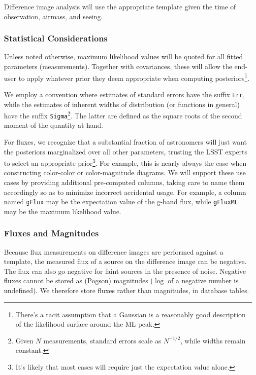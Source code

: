 \documentclass[12pt]{article}
\begin{document}
Difference image analysis will use the appropriate template given the time of observation, airmass, and seeing.

\subsubsection{Statistical Considerations}

Unless noted otherwise, maximum likelihood values will be quoted for all fitted parameters (measurements). Together with covariances, these will allow the end-user to apply whatever prior they deem appropriate when computing posteriors\footnote{There's a tacit assumption that a Gaussian is a reasonably good description of the likelihood surface around the ML peak.}.

We employ a convention where estimates of standard errors have the suffix {\tt Err}, while the estimates of inherent widths of distribution (or functions in general) have the suffix {\tt Sigma}\footnote{Given $N$ measurements, standard errors scale as $N^{-1/2}$, while widths remain constant.}. The latter are defined as the square roots of the second moment of the quantity at hand.

For fluxes, we recognize that a substantial fraction of astronomers will just want the posteriors marginalized over all other parameters, trusting the LSST experts to select an appropriate prior\footnote{It's likely that most cases will require just the expectation value alone.}. For example, this is nearly always the case when constructing color-color or color-magnitude diagrams. We will support these use cases by providing additional pre-computed columns, taking care to name them accordingly so as to minimize incorrect accidental usage. For example, a column named \texttt{gFlux} may be the expectation value of the g-band flux, while \texttt{gFluxML} may be the maximum likelihood value.

\subsubsection{Fluxes and Magnitudes}
\label{sec:fluxes}

Because flux measurements on difference images are performed against a template, the measured flux of a source on the difference image can be negative. The flux can also go negative for faint sources in the presence of noise. Negative fluxes cannot be stored as (Pogson) magnitudes ($\log$ of a negative number is undefined). We therefore store fluxes rather than magnitudes, in database tables.
\end{document}
